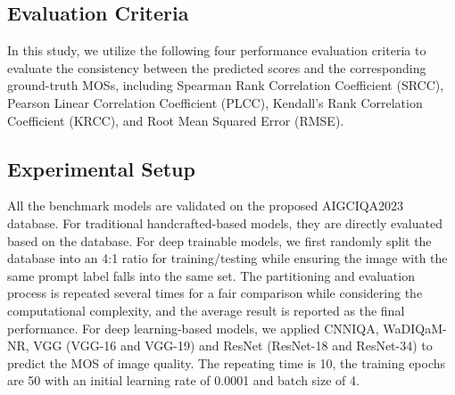 \documentclass[runningheads]{llncs}
\begin{document}
\subsection{Evaluation Criteria}





In this study, we utilize the following four performance evaluation criteria to evaluate
the consistency between the predicted scores and the corresponding ground-truth MOSs, including Spearman Rank Correlation Coefficient (SRCC), Pearson Linear Correlation Coefficient (PLCC), Kendall’s Rank Correlation Coefficient (KRCC), and Root Mean Squared Error (RMSE).



\subsection{ Experimental Setup}
All the benchmark models are validated on the proposed AIGCIQA2023 database. 
For traditional handcrafted-based models, they are directly evaluated based on the database.
For deep trainable models, we first randomly split the database into an 4:1 ratio for training/testing while ensuring the image with the same prompt label falls into the same set. 
The partitioning and evaluation process is repeated several times for a fair comparison while considering the computational complexity, and the average result is reported as the final performance. 
For deep learning-based models, we applied CNNIQA\cite{kang2014convolutional}, WaDIQaM-NR\cite{bosse2017deep}, VGG (VGG-16 and VGG-19)\cite{simonyan2014very} and ResNet (ResNet-18 and ResNet-34)\cite{he2016deep} to predict the MOS of image quality. 
The repeating time is 10, the training epochs are 50 with an initial learning rate of 0.0001 and batch size of 4.
\end{document}
